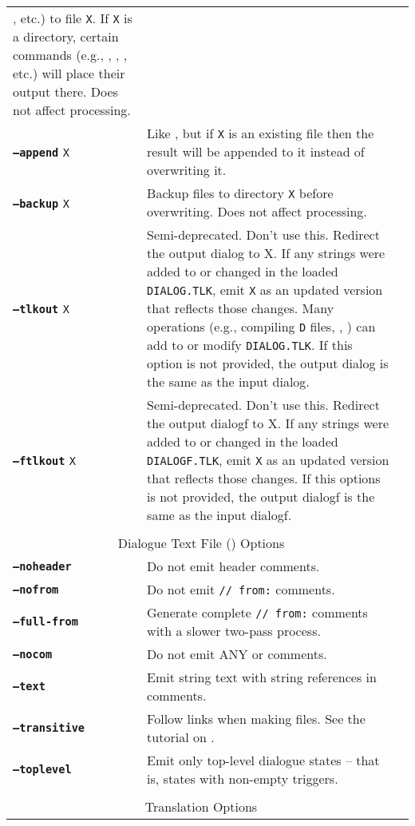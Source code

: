 \documentclass{article}
\def\ttref#1{\ahrefloc{#1}{\tt #1}}
\def\DEFINE#1{{\tt \bf #1}\label{#1}\index{#1}}
\def\t#1{{\tt #1}}
\begin{document}
\begin{tabular}{lp{10in}|p{10in}}
\ttref{--dcmp-from}, etc.) to file {\tt X}. If \t{X} is a directory,
certain commands (e.g., \ttref{D}, \ttref{DLG}, \ttref{--biff-get}, etc.)
will place their output there.  Does not affect \ttref{TP2} processing. \\
\DEFINE{--append} \t{X} & Like \ttref{--out}, but if \t{X} is an existing
file then the result will be appended to it instead of overwriting it. \\
\DEFINE{--backup} \t{X} &	Backup files to directory {\tt X} before overwriting. Does not affect \ttref{TP2} processing. \\
\DEFINE{--tlkout} \t{X} & Semi-deprecated. Don't use this. Redirect the output dialog to X. If any strings were added to or changed in the loaded \t{DIALOG.TLK}, emit \t{X} as an updated version that reflects those changes. Many operations (e.g., compiling \t{D} files, \ttref{--tlkmerge}, \ttref{STRING!SET}) can add to or modify \t{DIALOG.TLK}. If this option is not provided, the output dialog is the same as the input dialog. \\
\DEFINE{--ftlkout} \t{X} & Semi-deprecated. Don't use this. Redirect the output dialogf to X. If any strings were added to or changed in the
loaded \t{DIALOGF.TLK}, emit \t{X} as an updated version that reflects
those changes. If this options is not provided, the output dialogf is the same as the input dialogf. \\
\\
\multicolumn{2}{c}{ \color{red} Dialogue Text File (\ttref{D}) Options} \\
\DEFINE{--noheader} &	Do not emit \ttref{D} header comments. \\
\DEFINE{--nofrom} &	Do not emit \ttref{D} {\tt // from:} comments. \\
\DEFINE{--full-from} &  Generate complete {\tt // from:} comments with a
slower two-pass process. \\
\DEFINE{--nocom} & Do not emit ANY \ttref{D} or \ttref{BAF} comments. \\
\DEFINE{--text} & Emit string text with string references in comments. \\
\DEFINE{--transitive} & Follow \ttref{EXTERN} links when making \ttref{D}
files. See the tutorial on \ttref{--transitive}. \\
\DEFINE{--toplevel} & Emit only top-level dialogue states -- that is,
states with non-empty triggers. \\
\\
\multicolumn{2}{c}{ \color{red} Translation Options} \\

\end{tabular}
\end{document}
